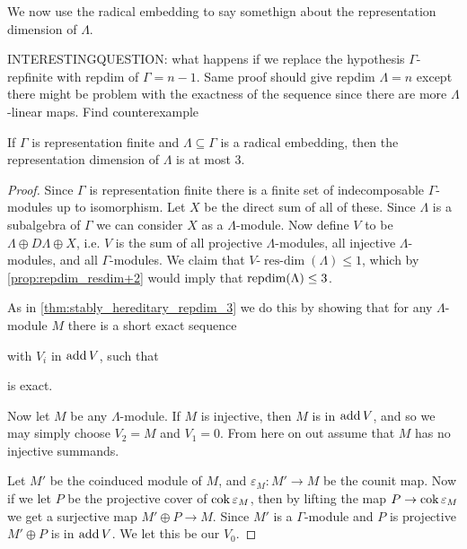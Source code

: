We now use the radical embedding to say somethign about the representation dimension of $\Lambda$.

INTERESTINGQUESTION: what happens if we replace the hypothesis $\Gamma$-repfinite with repdim of $\Gamma= n-1$. Same proof should give repdim $\Lambda=n$ except there might be problem with the exactness of the sequence since there are more $\Lambda$-linear maps. Find counterexample 

\begin{theorem}\label{thm:radical_embedding_repdim_3}
	If $\Gamma$ is representation finite and $\Lambda \subseteq \Gamma$ is a radical embedding, then the representation dimension of $\Lambda$ is at most 3.
	\begin{proof}
		Since $\Gamma$ is representation finite there is a finite set of indecomposable $\Gamma$-modules up to isomorphism. Let $X$ be the direct sum of all of these. Since $\Lambda$ is a subalgebra of $\Gamma$ we can consider $X$ as a $\Lambda$-module. Now define $V$ to be $\Lambda \oplus D\Lambda \oplus X$, i.e. $V$ is the sum of all projective $\Lambda$-modules, all injective $\Lambda$-modules, and all $\Gamma$-modules. We claim that $V$-$\operatorname{res-dim}(\Lambda) \leq 1$, which by \cref{prop:repdim_resdim+2} would imply that $\operatorname{repdim}(\Lambda) \leq 3$.
		
		As in \cref{thm:stably_hereditary_repdim_3} we do this by showing that for any  $\Lambda$-module $M$ there is a short exact sequence
		\begin{center}
		\end{center}
		with $V_i$ in $\operatorname{add} V$, such that 
		\begin{center}
		\end{center}
		is exact. 
		
		Now let $M$ be any $\Lambda$-module. If $M$ is injective, then $M$ is in $\operatorname{add} V$, and so we may simply choose $V_2 = M$ and $V_1=0$. From here on out assume that $M$ has no injective summands. 
		
		Let $M'$ be the coinduced module of $M$, and $\varepsilon_M\colon M' \to M$ be the counit map. Now if we let $P$ be the projective cover of $\operatorname{cok} \varepsilon_M$, then by lifting the map $P \to \operatorname{cok}\varepsilon_M$ we get a surjective map $M' \oplus P \to M$. Since $M'$ is a $\Gamma$-module and $P$ is projective $M'\oplus P$ is in $\operatorname{add} V$. We let this be our $V_0$.
		

\end{proof}
\end{theorem}
